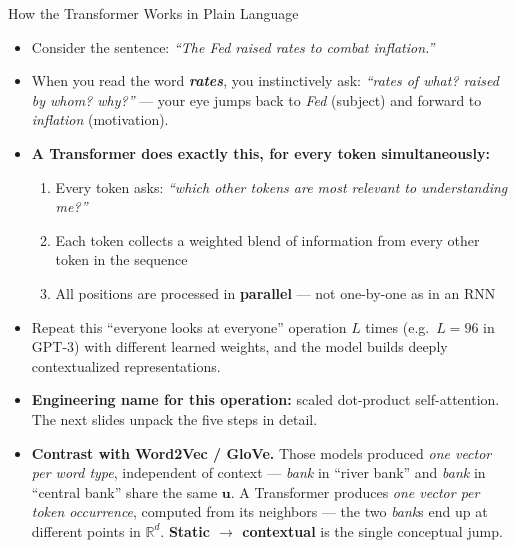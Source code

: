 \begin{frame}{How the Transformer Works in Plain Language}
\begin{itemize}
\item Consider the sentence: \textit{``The Fed raised rates to combat inflation.''}

\medskip
\item When you read the word \textbf{\textit{rates}}, you instinctively ask: \emph{``rates of what? raised by whom? why?''} --- your eye jumps back to \textit{Fed} (subject) and forward to \textit{inflation} (motivation).

\medskip
\item \textbf{A Transformer does exactly this, for every token simultaneously:}
\begin{enumerate}
    \item Every token asks: \emph{``which other tokens are most relevant to understanding me?''}
    \item Each token collects a weighted blend of information from every other token in the sequence
    \item All positions are processed in \textbf{parallel} --- not one-by-one as in an RNN
\end{enumerate}

\medskip
\item Repeat this ``everyone looks at everyone'' operation $L$ times (e.g.\ $L=96$ in GPT-3) with different learned weights, and the model builds deeply contextualized representations.

\medskip
\item \textbf{Engineering name for this operation:} scaled dot-product self-attention. The next slides unpack the five steps in detail.

\medskip
\item \textbf{Contrast with Word2Vec / GloVe.} Those models produced \emph{one vector per word type}, independent of context --- \emph{bank} in ``river bank'' and \emph{bank} in ``central bank'' share the same $\mathbf{u}$. A Transformer produces \emph{one vector per token occurrence}, computed from its neighbors --- the two \emph{bank}s end up at different points in $\mathbb{R}^{d}$. \textbf{Static $\to$ contextual} is the single conceptual jump.
\end{itemize}
\end{frame}

